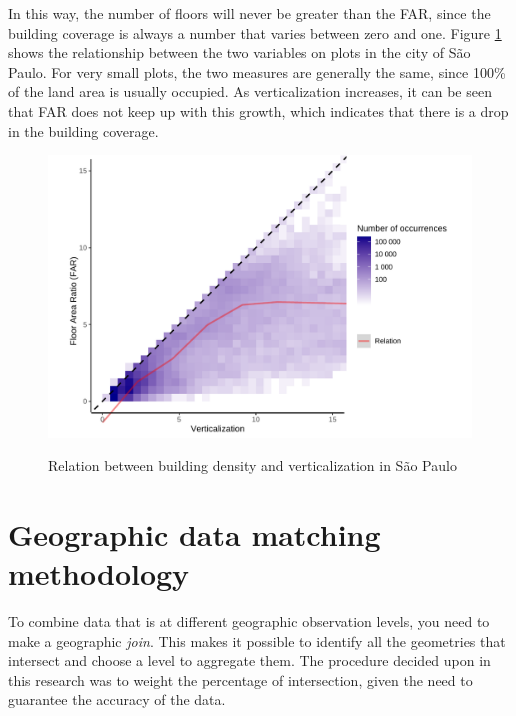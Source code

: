 \begin{apendicesenv}
    In this way, the number of floors will never be greater than the FAR, since the building coverage is always a number that varies between zero and one. Figure \ref{fig:ca-vert} shows the relationship between the two variables on plots in the city of São Paulo. For very small plots, the two measures are generally the same, since 100\% of the land area is usually occupied. As verticalization increases, it can be seen that FAR does not keep up with this growth, which indicates that there is a drop in the building coverage.
    
    \begin{figure}[h]
        \centering
        \caption{Relation between building density and verticalization in São Paulo}
        \includegraphics[width = \textwidth]{figuras/ca_vs_verticalizacao.pdf}
        \label{fig:ca-vert}
    \end{figure}
    
    \chapter{Geographic data matching methodology}
    \label{appendix:cross-referencing}
    
    To combine data that is at different geographic observation levels, you need to make a geographic \textit{join}. This makes it possible to identify all the geometries that intersect and choose a level to aggregate them. The procedure decided upon in this research was to weight the percentage of intersection, given the need to guarantee the accuracy of the data.
    

\end{apendicesenv}
